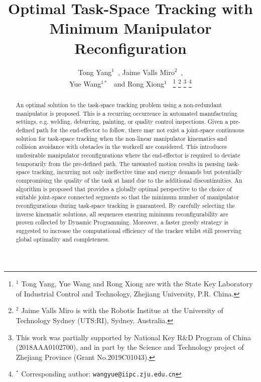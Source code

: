 \documentclass[letterpaper, 10 pt, conference]{ieeeconf}  %
\title{\LARGE \bf
Optimal Task-Space Tracking with Minimum Manipulator Reconfiguration
}
\author{Tong Yang$^{1}$~\IEEEmembership{Student Member,~IEEE}, Jaime Valls Miro$^2$~\IEEEmembership{Member,~IEEE}, \\Yue Wang$^{1*}$~\IEEEmembership{Member,~IEEE} and Rong Xiong$^1$~\IEEEmembership{Member,~IEEE}
\thanks{$^1$ Tong Yang, Yue Wang and Rong Xiong are with the State Key 
Laboratory of Industrial Control and Technology, Zhejiang University, P.R. China. 
}
\thanks{$^2$ Jaime Valls Miro is with the Robotis Institue at the University of Technology Sydney (UTS:RI), Sydney, Australia.}
\thanks{This work was partially supported by National Key R\&D Program of China (2018AAA0102700), and in part by the Science and Technology project of Zhejiang Province (Grant No.2019C01043).}
\thanks{$^*$ Corresponding author: {\tt\small wangyue@iipc.zju.edu.cn}}
}
\begin{document}
\maketitle
\thispagestyle{empty}
\pagestyle{empty}

\begin{abstract}
An optimal solution to the task-space tracking problem using a non-redundant manipulator is proposed. This is a recurring occurrence in automated manufacturing settings, 
e.g.  welding, deburring, painting, %
or quality control inspections. 
Given a pre-defined %
path for the end-effector to follow, there may not exist a joint-space continuous solution for task-space tracking when the non-linear manipulator kinematics and collision avoidance with obstacles in the workcell are considered. This introduces undesirable manipulator reconfigurations where the end-effector is required to deviate temporarily from the pre-defined path. 
The unwanted motion results in pausing task-space tracking, incurring not only ineffective time and energy demands but potentially compromising the quality of the task at hand due to the additional discontinuities. 
An algorithm is proposed that provides a globally optimal perspective to the choice of suitable joint-space connected segments so that the minimum number of manipulator reconfigurations during task-space tracking is guaranteed.  By carefully selecting the inverse kinematic solutions, all sequences %
ensuring minimum reconfigurability are proven collected by  Dynamic Programming. 
Moreover, a faster greedy strategy is suggested to increase the computational efficiency of the tracker whilst still preserving global optimality and completeness. 

\end{abstract}
\end{document}
